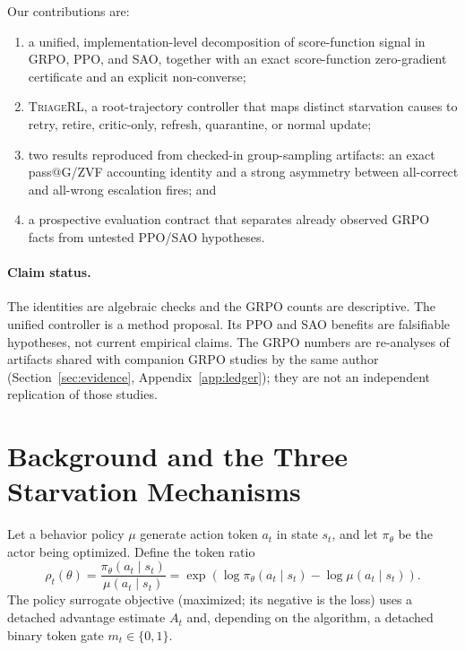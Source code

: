 \documentclass{article}
\newcommand{\method}{\textsc{TriageRL}\xspace}
\begin{document}
Our contributions are:
\begin{enumerate}[leftmargin=*,itemsep=2pt]
  \item a unified, implementation-level decomposition of score-function
  signal in GRPO, PPO, and SAO, together with an exact score-function zero-gradient
  certificate and an explicit non-converse;
  \item \method, a root-trajectory controller that maps distinct starvation
  causes to retry, retire, critic-only, refresh, quarantine, or normal update;
  \item two results reproduced from checked-in group-sampling artifacts: an
  exact pass@G/ZVF accounting identity and a strong asymmetry between
  all-correct and all-wrong escalation fires; and
  \item a prospective evaluation contract that separates already observed
  GRPO facts from untested PPO/SAO hypotheses.
\end{enumerate}

\paragraph{Claim status.}
The identities are algebraic checks and the GRPO counts are descriptive.
The unified controller is a method proposal.  Its PPO and SAO benefits are
falsifiable hypotheses, not current empirical claims.  The GRPO numbers are
re-analyses of artifacts shared with companion GRPO studies by the same author
(Section~\ref{sec:evidence}, Appendix~\ref{app:ledger}); they are not an
independent replication of those studies.

\section{Background and the Three Starvation Mechanisms}
\label{sec:background}

Let a behavior policy $\mu$ generate action token $a_t$ in state $s_t$, and
let $\pi_\theta$ be the actor being optimized.  Define the token ratio
\begin{equation}
  \rho_t(\theta)=
  \frac{\pi_\theta(a_t\mid s_t)}{\mu(a_t\mid s_t)}
  =\exp\!\left(\log\pi_\theta(a_t\mid s_t)
        -\log\mu(a_t\mid s_t)\right).
  \label{eq:ratio}
\end{equation}
The policy surrogate objective (maximized; its negative is the loss) uses a
detached advantage estimate $A_t$ and, depending on the algorithm, a detached
binary token gate $m_t\in\{0,1\}$.
\end{document}
